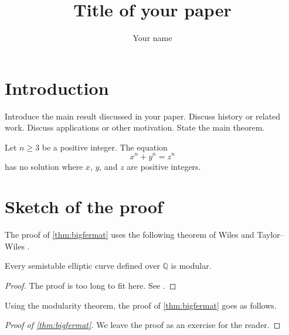 \documentclass{article}
\title{Title of your paper}
\author{Your name}
\newcommand{\Q}{\mathbb Q} %
\begin{document}
\maketitle


\section{Introduction}
\label{sec:intro}
Introduce the main result discussed in your paper.
Discuss history or related work.
Discuss applications or other motivation.
State the main theorem.
\begin{theorem}
  \label{thm:bigfermat}
  Let $n \geq 3$ be a positive integer.
  The equation
  \[ x^n + y^n = z^n\]
  has no solution where $x$, $y$, and $z$ are positive integers.
\end{theorem}

\section{Sketch of the proof}
The proof of \autoref{thm:bigfermat} uses the following theorem of Wiles \cite{wiles} and Taylor--Wiles \cite{taylor-wiles}.
\begin{theorem}
  Every semistable elliptic curve defined over $\Q$ is modular.
\end{theorem}
\begin{proof}
  The proof is too long to fit here.
  See \cite[Theorem 0.4]{wiles}.
\end{proof}

Using the modularity theorem, the proof of \autoref{thm:bigfermat} goes as follows.
\begin{proof}[Proof of \autoref{thm:bigfermat}]
  We leave the proof as an exercise for the reader.
\end{proof}
\end{document}
